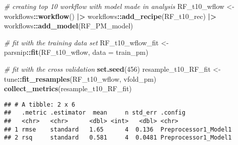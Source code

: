 \documentclass[
]{article}
\newenvironment{Shaded}{\begin{snugshade}}{\end{snugshade}}
\newcommand{\AttributeTok}[1]{\textcolor[rgb]{0.13,0.29,0.53}{#1}}
\newcommand{\CommentTok}[1]{\textcolor[rgb]{0.56,0.35,0.01}{\textit{#1}}}
\newcommand{\DecValTok}[1]{\textcolor[rgb]{0.00,0.00,0.81}{#1}}
\newcommand{\FunctionTok}[1]{\textcolor[rgb]{0.13,0.29,0.53}{\textbf{#1}}}
\newcommand{\NormalTok}[1]{#1}
\newcommand{\OtherTok}[1]{\textcolor[rgb]{0.56,0.35,0.01}{#1}}
\newcommand{\SpecialCharTok}[1]{\textcolor[rgb]{0.81,0.36,0.00}{\textbf{#1}}}
\begin{document}
\begin{Shaded}
\begin{Highlighting}[]
\CommentTok{\# creating top 10 workflow with model made in analysis}
\NormalTok{RF\_t10\_wflow }\OtherTok{\textless{}{-}}\NormalTok{ workflows}\SpecialCharTok{::}\FunctionTok{workflow}\NormalTok{() }\SpecialCharTok{|\textgreater{}}
\NormalTok{  workflows}\SpecialCharTok{::}\FunctionTok{add\_recipe}\NormalTok{(RF\_t10\_rec) }\SpecialCharTok{|\textgreater{}}
\NormalTok{  workflows}\SpecialCharTok{::}\FunctionTok{add\_model}\NormalTok{(RF\_PM\_model)}

\CommentTok{\# fit with the training data set}
\NormalTok{RF\_t10\_wflow\_fit }\OtherTok{\textless{}{-}}\NormalTok{ parsnip}\SpecialCharTok{::}\FunctionTok{fit}\NormalTok{(RF\_t10\_wflow, }\AttributeTok{data =}\NormalTok{ train\_pm)}

\CommentTok{\# fit with the cross validation }
\FunctionTok{set.seed}\NormalTok{(}\DecValTok{456}\NormalTok{)}
\NormalTok{resample\_t10\_RF\_fit }\OtherTok{\textless{}{-}}\NormalTok{ tune}\SpecialCharTok{::}\FunctionTok{fit\_resamples}\NormalTok{(RF\_t10\_wflow, vfold\_pm)}
\FunctionTok{collect\_metrics}\NormalTok{(resample\_t10\_RF\_fit)}
\end{Highlighting}
\end{Shaded}

\begin{verbatim}
## # A tibble: 2 x 6
##   .metric .estimator  mean     n std_err .config             
##   <chr>   <chr>      <dbl> <int>   <dbl> <chr>               
## 1 rmse    standard   1.65      4  0.136  Preprocessor1_Model1
## 2 rsq     standard   0.581     4  0.0481 Preprocessor1_Model1
\end{verbatim}
\end{document}
